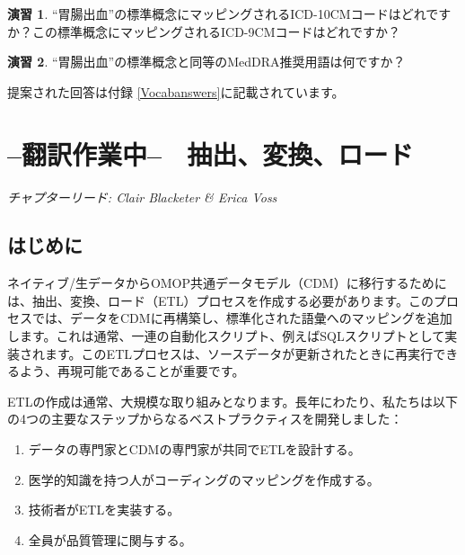 \documentclass[
  11pt]{book}
\providecommand{\tightlist}{%
  \setlength{\itemsep}{0pt}\setlength{\parskip}{0pt}}
\theoremstyle{definition}
\theoremstyle{definition}
\theoremstyle{definition}
\newtheorem{exercise}{演習}[chapter]
\theoremstyle{definition}
\theoremstyle{remark}
\begin{document}
\begin{exercise}
\protect\hypertarget{exr:exerciseVocab2}{}\label{exr:exerciseVocab2}``胃腸出血''の標準概念にマッピングされるICD-10CMコードはどれですか？この標準概念にマッピングされるICD-9CMコードはどれですか？
\end{exercise}

\begin{exercise}
\protect\hypertarget{exr:exerciseVocab3}{}\label{exr:exerciseVocab3}``胃腸出血''の標準概念と同等のMedDRA推奨用語は何ですか？
\end{exercise}

提案された回答は付録 \ref{Vocabanswers}に記載されています。

\chapter{--翻訳作業中--　抽出、変換、ロード}\label{ExtractTransformLoad}

\emph{チャプターリード: Clair Blacketer \& Erica Voss}

\section{はじめに}\label{ux306fux3058ux3081ux306b}

ネイティブ/生データからOMOP共通データモデル（CDM）に移行するためには、抽出、変換、ロード（ETL）プロセスを作成する必要があります。このプロセスでは、データをCDMに再構築し、標準化された語彙へのマッピングを追加します。これは通常、一連の自動化スクリプト、例えばSQLスクリプトとして実装されます。このETLプロセスは、ソースデータが更新されたときに再実行できるよう、再現可能であることが重要です。   

ETLの作成は通常、大規模な取り組みとなります。長年にわたり、私たちは以下の4つの主要なステップからなるベストプラクティスを開発しました：

\begin{enumerate}
\def\labelenumi{\arabic{enumi}.}
\tightlist
\item
  データの専門家とCDMの専門家が共同でETLを設計する。
\item
  医学的知識を持つ人がコーディングのマッピングを作成する。
\item
  技術者がETLを実装する。
\item
  全員が品質管理に関与する。
\end{enumerate}
\end{document}
